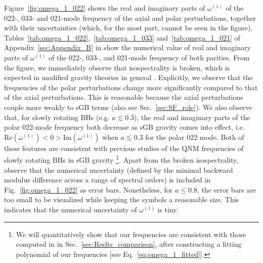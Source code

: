\documentclass[aps,prx,amsmath,floats,floatfix,twocolumn,
  superscriptaddress,nofootinbib,showpacs]{revtex4-1}
\begin{document}
Figure~\ref{fig:omega_1_022} shows the real and imaginary parts of $\omega^{(1)}$ of the 022-, 033- and 021-mode frequency of the axial and polar perturbations, together with their uncertainties (which, for the most part, cannot be seen in the figure). 
Tables~\ref{tab:omega_1_022},~\ref{tab:omega_1_033} and~\ref{tab:omega_1_021} of Appendix~\ref{sec:Appendix_B} in show the numerical value of real and imaginary parts of $\omega^{(1)}$ of the 022-, 033-, and 021-mode frequency of both parities. 
From the figure, we immediately observe that  isospectrality is broken, which is expected in modified gravity theories in general \cite{QNM_EdGB_01, QNM_EdGB_02, QNM_EdGB_03, QNM_dCS_01, QNM_dCS_02, QNM_dCS_03, QNM_dCS_04, isospectrality-paper}. 
Explicitly, we observe that the frequencies of the polar perturbations change more significantly compared to that of the axial perturbations.  
This is reasonable because the axial perturbations couple more weakly to sGB terms \cite{Blazquez-Salcedo:2016enn, Pierini:2021jxd, Pierini:2022eim} (also see Sec.~\ref{sec:SF_role}). 
We also observe that, for slowly rotating BHs (e.g. $a \lesssim 0.3$), the real and imaginary parts of the polar 022-mode frequency both decrease as sGB gravity comes into effect, i.e.~$\text{Re}(\omega^{(1)}) < 0 > \text{Im}(\omega^{(1)})$ when $a \lesssim 0.3$ for the polar $022$ mode. 
Both of these features are consistent with previous studies of the QNM frequencies of slowly rotating BHs in sGB gravity  \cite{Blazquez-Salcedo:2016enn, Pierini:2021jxd, Pierini:2022eim}\footnote{We will quantitatively show that our frequencies are consistent with those computed in \cite{Blazquez-Salcedo:2016enn, Pierini:2021jxd, Pierini:2022eim} in Sec.~\ref{sec:Reslts_comparison}, after constructing a fitting polynomial of our frequencies [see Eq.~\eqref{eq:omega_1_fitted}].}.
Apart from the broken isospectrality, observe that the numerical uncertainty (defined by the minimal backward modulus difference across a range of spectral orders) is included in Fig.~\ref{fig:omega_1_022} as error bars. 
Nonetheless, for $a \leq 0.8 $, the error bars are too small to be visualized while keeping the symbols a reasonable size. 
This indicates that the numerical uncertainty of $\omega^{(1)}$ is tiny.
\end{document}
